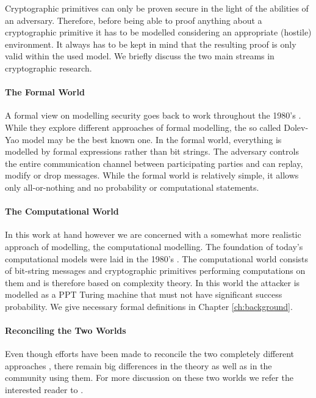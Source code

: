 Cryptographic primitives can only be proven secure in the light of the abilities of an adversary.
Therefore, before being able to proof anything about a cryptographic primitive it has to be modelled considering an appropriate (hostile) environment.
It always has to be kept in mind that the resulting proof is only valid within the used model.
We briefly discuss the two main streams in cryptographic research.

\paragraph{The Formal World}
A formal view on modelling security goes back to work throughout the 1980's \cite{DeMillo82,Dolev83,Millen87,Meadows91,Kemmerer1988,Burrows90}.
While they explore different approaches of formal modelling, the so called Dolev-Yao model \cite{Dolev83} may be the best known one.
In the formal world, everything is modelled by formal expressions rather than bit strings.
The adversary controls the entire communication channel between participating parties and can replay, modify or drop messages.
While the formal world is relatively simple, it allows only all-or-nothing  and no probability or computational statements.

\paragraph{The Computational World}
In this work at hand however we are concerned with a somewhat more realistic approach of modelling, the computational modelling.
The foundation of today's computational models were laid in the 1980's \cite{Goldwasser82,Goldwasser84,Yao82,Blum82}.
The computational world consists of bit-string messages and cryptographic primitives performing computations on them and is therefore based on complexity theory.
In this world the attacker is modelled as a \ac{PPT} Turing machine \cite{Turing37} that must not have significant success probability.
We give necessary formal definitions in Chapter \ref{ch:background}.

\paragraph{Reconciling the Two Worlds}
Even though efforts have been made to reconcile the two completely different approaches \cite{Abadi2002,Herzog2005}, there remain big differences in the theory as well as in the community using them.
For more discussion on these two worlds we refer the interested reader to \cite{cortier2011survey}.


